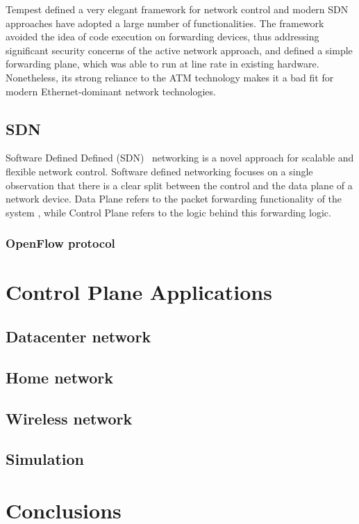 Tempest defined a very elegant framework for network control and modern
SDN approaches have adopted a large number of functionalities. The framework
avoided the idea of code execution on forwarding devices, thus addressing
significant security concerns of the active network approach, and defined a
simple forwarding plane, which was able to run at line rate in existing
hardware. Nonetheless, its strong reliance to the ATM technology makes it a bad
fit for modern Ethernet-dominant network technologies. 

\subsection{SDN}

Software Defined Defined (SDN)~\cite{sdn} networking is a novel approach for scalable 
and flexible network control. Software defined networking focuses on a single
observation that there is a clear split between the control and the data plane
of a network device. Data Plane refers to the packet forwarding functionality of the system
, while Control Plane refers to the logic behind this forwarding logic. 
\subsubsection{OpenFlow protocol}

\section{Control Plane Applications} \label{sec:background:ofapp}
\subsection{Datacenter network}
\subsection{Home network}
\subsection{Wireless network}
\subsection{Simulation}

\section{Conclusions}
